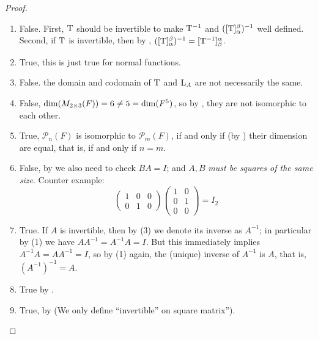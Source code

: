 \begin{proof} \ 

\begin{enumerate}
\item False.
    First, \(\mathrm{T}\) should be invertible to make \(\mathrm{T}^{-1}\) and \(([\mathrm{T}]_{\alpha}^{\beta})^{-1}\) well defined.
    Second, if \(\mathrm{T}\) is invertible, then by , \(([\mathrm{T}]_{\alpha}^{\beta})^{-1} = [\mathrm{T}^{-1}]_{\beta}^{\alpha}\).
\item True, this is just true for normal functions.
\item False. the domain and codomain of \(\mathrm{T}\) and \(\mathrm{L}_A\) are not necessarily the same.
\item False, \(\dim(M_{2 \times 3}(F)) = 6 \ne 5 = \dim(F^5)\), so by , they are not isomorphic to each other.
\item True, \(\mathcal{P}_n(F)\) is isomorphic to \(\mathcal{P}_m(F)\), if and only if (by ) their dimension are equal, that is, if and only if \(n = m\).
\item False, by  we also need to check \(BA = I\); and \(A, B\) \emph{must be squares of the same size}.
    Counter example:
    \[
        \left(\begin{array}{lll}
            1 & 0 & 0 \\
            0 & 1 & 0
        \end{array}\right)
        \left(\begin{array}{ll}
            1 & 0 \\
            0 & 1 \\
            0 & 0
        \end{array}\right) = I_2
    \]
\item True.
    If \(A\) is invertible, then by (3) we denote its inverse as \(A^{-1}\);
    in particular by (1) we have \(A A^{-1} = A^{-1} A = I\).
    But this immediately implies \(A^{-1} A = A A^{-1} = I\), so by (1) again, the (unique) inverse of \(A^{-1}\) is \(A\), that is, \((A^{-1})^{-1} = A\).
\item True by .
\item True, by  (We only define ``invertible'' on square matrix'').
\end{enumerate}
\end{proof}

